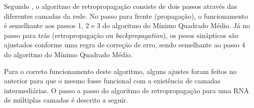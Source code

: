 \documentclass[12pt,oneside,a4paper,chapter=TITLE,section=TITLE,sumario
		=tradicional]{abntex2}
\begin{document}
		\begin{figure}[h]
		\end{figure}
				
		Segundo , o algoritmo de retropropagação consiste de dois passos através das diferentes camadas da rede. No passo para frente (propagação), o funcionamento é semelhante aos passos 1, 2 e 3 do algoritmo do Mínimo Quadrado Médio. Já no passo para trás (retropropagação ou \textit{backpropagation}), os pesos sinápticos são ajustados conforme uma regra de correção de erro, sendo semelhante ao passo 4 do algoritmo do Mínimo Quadrado Médio.
		
		Para o correto funcionamento deste algoritmo, alguns ajustes foram feitos no anterior para que o mesmo fosse funcional com a existência de camadas intermediárias. O passo a passo do algoritmo de retropropagação para uma RNA de múltiplas camadas é descrito a seguir.
		
\end{document}
